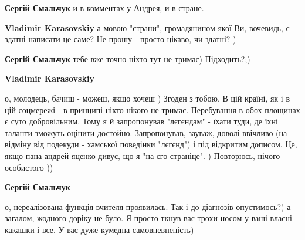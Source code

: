 \begin{itemize}
\begin{itemize}
\textbf{Сергій Смальчук} и в комментах у Андрея, и в стране.

 
\textbf{Vladimir Karasovskiy} а мовою "страни", громадянином якої Ви, вочевидь, є - здатні написати це саме? Не прошу - просто цікаво, чи здатні? )

 
\textbf{Сергій Смальчук} тебе вже точно ніхто тут не тримає) Підходить?;)

 
\textbf{Vladimir Karasovskiy} 

о, молодець, бачиш - можеш, якщо хочеш ) Згоден з тобою. В цій країні, як і в
цій соцмережі - в принципі ніхто нікого не тримає. Перебування в обох площинах
є суто добровільним. Тому я й запропонував "лєгєндам" - їхати туди, де їхні
таланти зможуть оцінити достойно. Запропонував, зауваж, доволі ввічливо (на
відміну від подекуди - хамської поведінки "лєгєнд") і під відкритим дописом.
Це, якщо пана андрей яценко дивує, що я "на єго страніце". ) Повторюсь, нічого
особистого ))


 
\textbf{Сергій Смальчук} 

о, нереалізована функція вчителя проявилась. Так і до діагнозів опустимось?) а
загалом, жодного доріку не було. Я просто ткнув вас трохи носом у ваші власні
какашки і все. У вас дуже кумедна самовпевненість)

 

\end{itemize}
\end{itemize}
